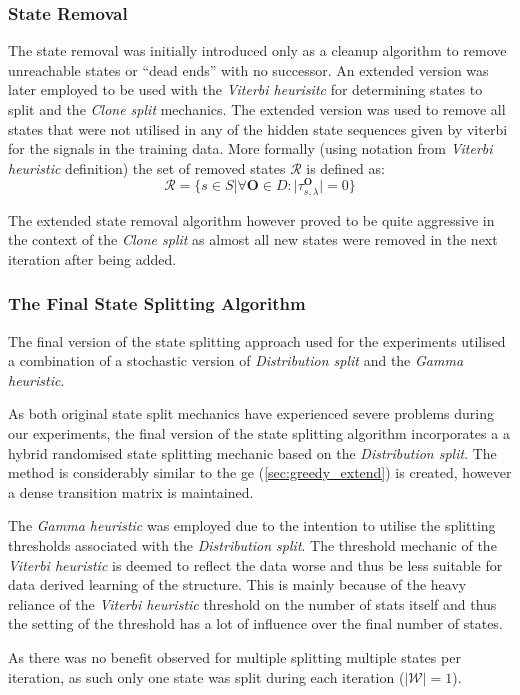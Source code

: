 \subsubsection{State Removal}
The state removal was initially introduced only as a cleanup algorithm to remove unreachable states or ``dead ends'' with no successor. An extended version was later employed to be used with the \emph{Viterbi heurisitc} for determining states to split and the \emph{Clone split} mechanics. The extended version was used to remove all states that were not utilised in any of the hidden state sequences given by \gls{viterbi} for the signals in the training data. More formally (using notation from \emph{Viterbi heuristic} definition) the set of removed states $\mathcal{R}$ is defined as:
$$\mathcal{R}=\{s\in S|\forall\mathbf{O}\in D: |\tau_{s,\lambda}^\mathbf{O}|=0\}$$

The extended state removal algorithm however proved to be quite aggressive in the context of the \emph{Clone split} as almost all new states were removed in the next iteration after being added.

\subsubsection{The Final State Splitting Algorithm}
The final version of the state splitting approach used for the experiments utilised a combination of a stochastic version of \emph{Distribution split} and the \emph{Gamma heuristic}.

As both original state split mechanics have experienced severe problems during our experiments, the final version of the state splitting algorithm incorporates a a hybrid randomised state splitting mechanic based on the \emph{Distribution split}. The method is considerably similar to the \acrlong{ge} (\ref{sec:greedy_extend}) is created, however a dense transition matrix is maintained.

The \emph{Gamma heuristic} was employed due to the intention to utilise the splitting thresholds associated with the \emph{Distribution split}. The threshold mechanic of the \emph{Viterbi heuristic} is deemed to reflect the data worse and thus be less suitable for data derived learning of the structure. This is mainly because of the heavy reliance of the \emph{Viterbi heuristic} threshold on the number of stats itself and thus the setting of the threshold has a lot of influence over the final number of states.

As there was no benefit observed for multiple splitting multiple states per iteration, as such only one state was split during each iteration ($|\mathcal{W}| = 1$).

